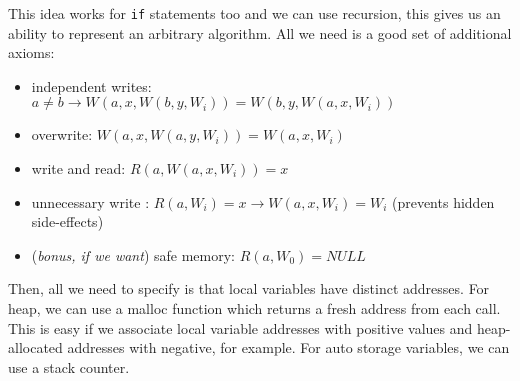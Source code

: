 \documentclass[a4paper,12pt]{article} %
\begin{document}
This idea works for \lstinline{if} statements too and we can use recursion, this gives us an ability to represent an arbitrary algorithm. All we need is a good set of additional axioms:

\begin{itemize}
    \item independent writes: $a \neq b \to W(a, x, W(b, y, W_i)) = W(b, y, W(a, x, W_i))$
    \item overwrite: $W(a, x, W(a, y, W_i)) = W(a, x, W_i)$
    \item write and read: $R(a, W(a, x, W_i)) = x$
    \item unnecessary write : $R(a, W_i) = x \to W(a, x, W_i) = W_i$ (prevents hidden side-effects)
    \item (\textit{bonus, if we want}) safe memory: $R(a, W_0) = NULL$
\end{itemize}

Then, all we need to specify is that local variables have distinct addresses. For heap, we can use a malloc function which returns a fresh address from each call. This is easy if we associate local variable addresses with positive values and heap-allocated addresses with negative, for example. For auto storage variables, we can use a stack counter.
\end{document}
